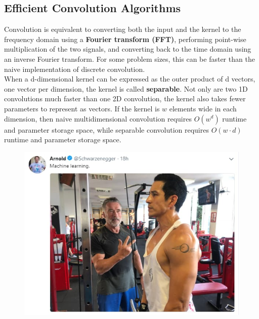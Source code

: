 \begin{multicols}{2}
	\subsection{Efficient Convolution Algorithms}
	Convolution is equivalent to converting both the input and the kernel to the frequency domain using a \textbf{Fourier transform (FFT)}, performing point-wise multiplication of the two signals, and converting back to the time domain using an inverse Fourier transform. For some problem sizes, this can be faster than the naive implementation of discrete convolution.\\

	When a d-dimensional kernel can be expressed as the outer product of d vectors, one vector per dimension, the kernel is called \textbf{separable}.
	Not only are two 1D convolutions much faster than one 2D convolution, the kernel also takes fewer parameters to represent as vectors.
	If the kernel is $w$ elements wide in each dimension, then naive multidimensional convolution requires $O(w^d)$ runtime and parameter storage space, while separable convolution requires $O(w\cdot d)$ runtime and parameter storage space.

	\begin{figure}[H]
		\centering
		\includegraphics[width=0.9\linewidth]{images/arni.jpeg}
	\end{figure}

\end{multicols}

\newpage
